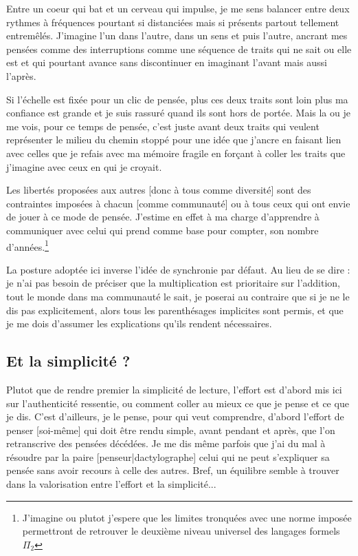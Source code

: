 \documentclass{article}
\begin{document}
Entre un coeur qui bat et un cerveau qui impulse, je me sens balancer entre deux  rythmes à fréquences pourtant si distanciées mais si présents partout tellement entremêlés. J'imagine l'un dans l'autre, dans un sens et puis l'autre, ancrant mes pensées  comme des interruptions comme une séquence de traits qui ne sait ou elle est et qui pourtant avance sans discontinuer en imaginant l'avant mais aussi l'après.

Si l'échelle est fixée pour un clic de pensée,  plus ces deux traits sont loin plus ma confiance est grande et je suis rassuré quand ils sont hors de portée. Mais la ou je me vois, pour ce temps de pensée, c'est juste avant deux traits qui veulent représenter le milieu du chemin stoppé pour une idée que j'ancre en faisant lien avec celles que je refais avec ma mémoire fragile en forçant à coller les traits que j'imagine avec ceux en qui je croyait. 

Les libertés proposées aux autres [donc à tous comme diversité] sont des contraintes imposées à chacun  [comme communauté] ou à tous ceux qui ont envie de jouer à ce mode de pensée. J'estime en effet à ma charge  d'apprendre à communiquer avec celui qui prend comme base pour compter, son nombre d'années.\footnote{J'imagine ou plutot j'espere que  les limites tronquées avec une norme imposée permettront de retrouver le deuxième niveau  universel des langages formels $\Pi_2$ }
 
 La posture adoptée ici inverse l’idée de synchronie par défaut. Au lieu de se dire : je n’ai pas besoin de préciser que la multiplication est prioritaire sur l’addition, tout le monde dans ma communauté le sait, je poserai au contraire que si je ne le dis pas explicitement, alors tous les parenthésages implicites sont permis, et que je me dois d’assumer les explications qu’ils rendent nécessaires.


 
\subsection{Et la simplicité ?}
Plutot que de rendre premier la simplicité de lecture, l'effort est d'abord mis ici sur l'authenticité ressentie, ou comment coller au mieux ce que je pense et ce que je dis. C'est d'ailleurs, je le pense, pour qui veut comprendre, d'abord l'effort de penser [soi-même] qui doit être rendu simple, avant pendant et après, que l'on retranscrive des pensées décédées. Je me dis même  parfois que j'ai du mal à résoudre par la paire [penseur|dactylographe] celui qui ne peut s'expliquer sa pensée sans avoir recours à celle des autres. Bref, un équilibre semble à trouver dans la valorisation entre l'effort et la simplicité...
\end{document}
